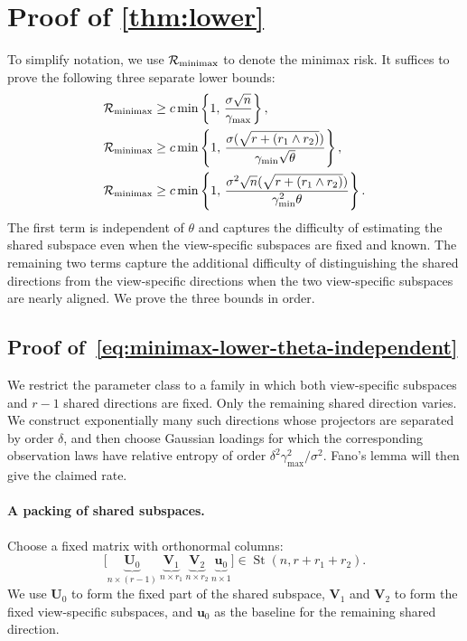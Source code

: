 \documentclass[11pt]{article}
\DeclareMathOperator{\St}{St}
\begin{document}
\section{Proof of \cref{thm:lower}}
To simplify notation, we use $\mathcal{R}_{\rm minimax}$ to denote the minimax risk. 
It suffices to prove the following three separate lower bounds:
\begin{subequations}
\label{eq:minimax-lower-appendix}
\begin{align}
  \mathcal{R}_{\rm minimax}
  &\ge
  c\min\left\{1,\,
  \frac{\sigma\sqrt n}{\gamma_{\max}}
  \right\},
  \label{eq:minimax-lower-theta-independent}
  \\
  \mathcal{R}_{\rm minimax}
  &\ge
  c\min\left\{1,\,
  \frac{\sigma(\sqrt{r+ (r_1\wedge r_2)})}
       {\gamma_{\min}\sqrt\theta}
  \right\},
  \label{eq:minimax-lower-sqrt-theta}
  \\
  \mathcal{R}_{\rm minimax}
  &\ge
  c\min\left\{1,\,
  \frac{\sigma^2\sqrt n(\sqrt{r+ (r_1\wedge r_2)})}
       {\gamma_{\min}^2\theta}
  \right\}.
  \label{eq:minimax-lower-theta}
\end{align}
\end{subequations}
The first term is independent of $\theta$ and captures the difficulty of estimating the shared subspace even when the view-specific subspaces are fixed and known. The remaining two terms capture the additional difficulty of distinguishing the shared directions from the view-specific directions when the two view-specific subspaces are nearly aligned. We prove the three bounds in order.


\subsection{Proof of~\cref{eq:minimax-lower-theta-independent}}



We restrict the parameter class to a family in which both view-specific
subspaces and $r-1$ shared directions are fixed.  Only the remaining shared
direction varies.  We construct exponentially many such directions whose
projectors are separated by order $\delta$, and then choose Gaussian loadings
for which the corresponding observation laws have relative entropy of order
$\delta^2\gamma_{\max}^2/\sigma^2$.  Fano's lemma will then give the claimed
rate.

\paragraph{A packing of shared subspaces.}
Choose a fixed matrix with orthonormal columns:
\[
  \bigl[
    \underbrace{\bm U_0}_{n\times(r-1)}
    \ \underbrace{\bm V_1}_{n\times r_1}
    \ \underbrace{\bm V_2}_{n\times r_2}
    \ \underbrace{\bm u_0}_{n\times 1}
  \bigr]
  \in\St(n,r+r_1+r_2).
\]
We use $\bm U_0$ to form the fixed part of the shared subspace,
$\bm V_1$ and $\bm V_2$ to form the fixed view-specific subspaces,
and $\bm u_0$ as the baseline for the remaining shared direction.
\end{document}
